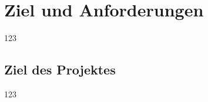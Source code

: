 \chapter{Ziel und Anforderungen}
\label{cha:Allgemeines}

123

\section{Ziel des Projektes}
\label{sec:Ziel}

123
